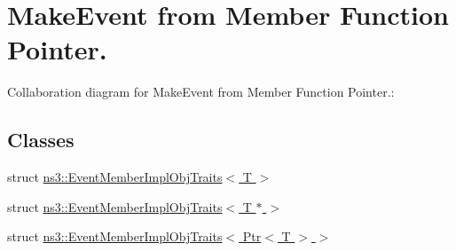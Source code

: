 \hypertarget{group__makeeventmemptr}{}\section{Make\+Event from Member Function Pointer.}
\label{group__makeeventmemptr}
Collaboration diagram for Make\+Event from Member Function Pointer.\+:
\subsection*{Classes}
\begin{DoxyCompactItemize}
\item 
struct \hyperlink{structns3_1_1EventMemberImplObjTraits}{ns3\+::\+Event\+Member\+Impl\+Obj\+Traits$<$ T $>$}
\item 
struct \hyperlink{structns3_1_1EventMemberImplObjTraits_3_01T_01_5_01_4}{ns3\+::\+Event\+Member\+Impl\+Obj\+Traits$<$ T $\ast$ $>$}
\item 
struct \hyperlink{structns3_1_1EventMemberImplObjTraits_3_01Ptr_3_01T_01_4_01_4}{ns3\+::\+Event\+Member\+Impl\+Obj\+Traits$<$ Ptr$<$ T $>$ $>$}
\end{DoxyCompactItemize}
